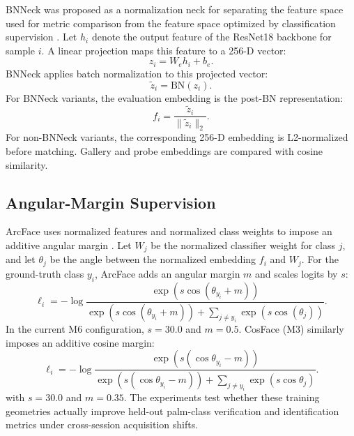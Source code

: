 BNNeck was proposed as a normalization neck for separating the feature space used for metric comparison from the feature space optimized by classification supervision \cite{luo2019strong}. Let $h_i$ denote the output feature of the ResNet18 backbone for sample $i$. A linear projection maps this feature to a 256-D vector:
\begin{equation}
    z_i = W_e h_i + b_e.
\end{equation}
BNNeck applies batch normalization to this projected vector:
\begin{equation}
    \tilde{z}_i = \mathrm{BN}(z_i).
\end{equation}
For BNNeck variants, the evaluation embedding is the post-BN representation:
\begin{equation}
    f_i = \frac{\tilde{z}_i}{\lVert \tilde{z}_i \rVert_2}.
\end{equation}
For non-BNNeck variants, the corresponding 256-D embedding is L2-normalized before matching. Gallery and probe embeddings are compared with cosine similarity.

\subsection{Angular-Margin Supervision}

ArcFace uses normalized features and normalized class weights to impose an additive angular margin \cite{deng2019arcface}. Let $W_j$ be the normalized classifier weight for class $j$, and let $\theta_j$ be the angle between the normalized embedding $f_i$ and $W_j$. For the ground-truth class $y_i$, ArcFace adds an angular margin $m$ and scales logits by $s$:
\begin{equation}
    \ell_i =
    -\log
    \frac{
        \exp \left(s \cos(\theta_{y_i} + m)\right)
    }{
        \exp \left(s \cos(\theta_{y_i} + m)\right)
        + \sum_{j \ne y_i} \exp \left(s \cos(\theta_j)\right)
    }.
\end{equation}
In the current M6 configuration, $s=30.0$ and $m=0.5$. CosFace (M3) similarly imposes an additive cosine margin:
\begin{equation}
    \ell_i =
    -\log
    \frac{
        \exp \left(s (\cos\theta_{y_i} - m)\right)
    }{
        \exp \left(s (\cos\theta_{y_i} - m)\right)
        + \sum_{j \ne y_i} \exp \left(s \cos\theta_j\right)
    }.
\end{equation}
with $s=30.0$ and $m=0.35$. The experiments test whether these training geometries actually improve held-out palm-class verification and identification metrics under cross-session acquisition shifts.
